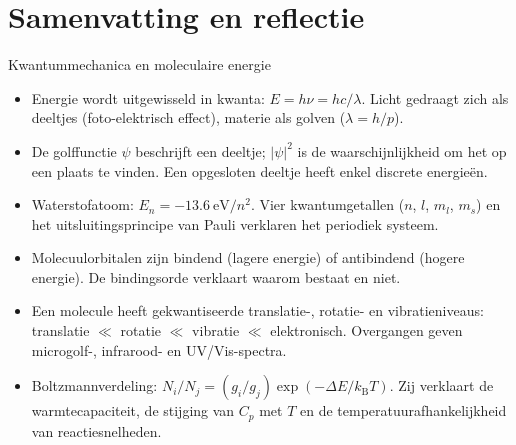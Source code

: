 \section{Samenvatting en reflectie}

\begin{samenvatting}{Kwantummechanica en moleculaire energie}
\begin{itemize}
\item Energie wordt uitgewisseld in kwanta: $E = h\nu = hc/\lambda$. Licht gedraagt zich als deeltjes (foto-elektrisch effect), materie als golven ($\lambda = h/p$).
\item De golffunctie $\psi$ beschrijft een deeltje; $|\psi|^2$ is de waarschijnlijkheid om het op een plaats te vinden. Een opgesloten deeltje heeft enkel discrete energieën.
\item Waterstofatoom: $E_n = -\SI{13.6}{\electronvolt}/n^2$. Vier kwantumgetallen ($n$, $l$, $m_l$, $m_s$) en het uitsluitingsprincipe van Pauli verklaren het periodiek systeem.
\item Molecuulorbitalen zijn bindend (lagere energie) of antibindend (hogere energie). De bindingsorde verklaart waarom  bestaat en  niet.
\item Een molecule heeft gekwantiseerde translatie-, rotatie- en vibratieniveaus: translatie $\ll$ rotatie $\ll$ vibratie $\ll$ elektronisch. Overgangen geven microgolf-, infrarood- en UV/Vis-spectra.
\item Boltzmannverdeling: $N_i/N_j = (g_i/g_j)\exp(-\Delta E/k_\mathrm{B}T)$. Zij verklaart de warmtecapaciteit, de stijging van $C_p$ met $T$ en de temperatuurafhankelijkheid van reactiesnelheden.
\end{itemize}
\end{samenvatting}


